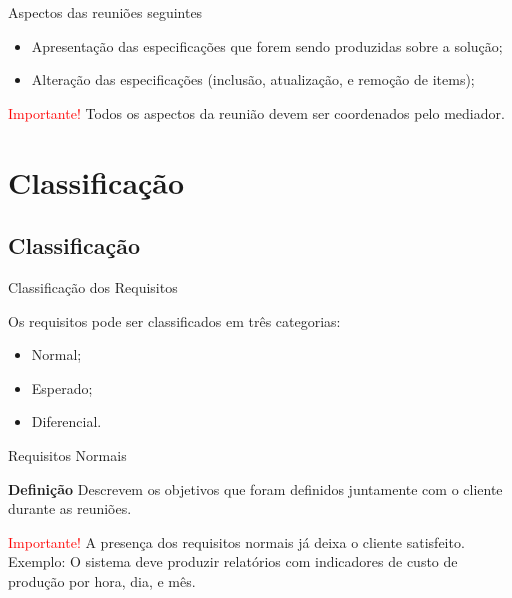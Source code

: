 \documentclass[xcolor=x11names,compress]{beamer}
\begin{document}
\begin{frame}{Aspectos das reuniões seguintes}

\begin{itemize}
\itemsep 5mm

\item Apresentação das especificações que forem sendo produzidas sobre a solução;

\item Alteração das especificações (inclusão, atualização, e remoção de items);


\end{itemize}

\pause

\begin{alertblock}{\centering \textcolor{red}{Importante!}}
Todos os aspectos da reunião devem ser coordenados pelo mediador.
\end{alertblock}

\end{frame}

\section{Classificação}
\subsection{Classificação}

\begin{frame}{Classificação dos Requisitos}

Os requisitos pode ser classificados em três categorias:

\begin{itemize}
\itemsep 5mm

\item Normal;

\item Esperado;

\item Diferencial.

\end{itemize}

\end{frame}

\begin{frame}{Requisitos Normais}

\begin{alertblock}{\textbf{Definição}}
Descrevem os objetivos que foram definidos juntamente com o cliente durante as reuniões.
\end{alertblock}

\pause

\begin{alertblock}{\centering \textcolor{red}{Importante!}}
A presença dos requisitos normais já deixa o cliente satisfeito. Exemplo: O sistema deve produzir relatórios com indicadores de custo de produção por hora, dia, e mês.
\end{alertblock}

\end{frame}
\end{document}
